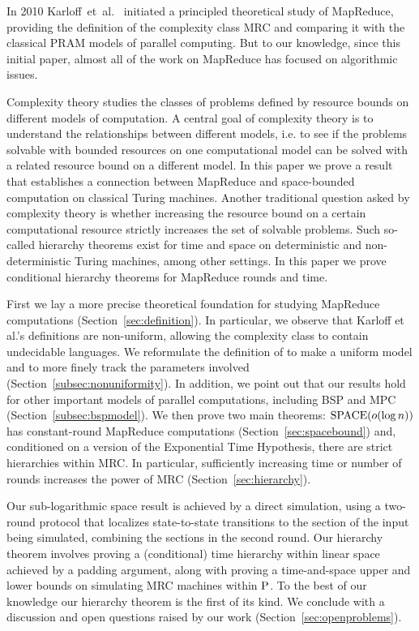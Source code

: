 \documentclass[11pt]{article}
\theoremstyle{definition}
\theoremstyle{remark}
\newcommand{\SPACE}{\textup{SPACE}}
\newcommand{\TISP}{\textup{TISP}}
\renewcommand{\P}{\textup{P}}
\begin{document}
In 2010 Karloff~et~al.~\cite{Karloff10} initiated a principled theoretical
study of MapReduce, providing the definition of the complexity class MRC and
comparing it with the classical PRAM models of parallel computing. But to our
knowledge, since this initial paper, almost all of the work on MapReduce has
focused on algorithmic issues.

Complexity theory studies the classes of problems defined by resource bounds on
different models of computation. A central goal of complexity theory is to
understand the relationships between different models, i.e. to see if the
problems solvable with bounded resources on one computational model can be
solved with a related resource bound on a different model.  In this paper we
prove a result that establishes a connection between MapReduce and
space-bounded computation on classical Turing machines.  Another traditional
question asked by complexity theory is whether increasing the resource bound on
a certain computational resource strictly increases the set of solvable
problems. Such so-called hierarchy theorems exist for time and space on
deterministic and non-deterministic Turing machines, among other settings.  In
this paper we prove conditional hierarchy theorems for MapReduce rounds and
time.

First we lay a more precise theoretical foundation for studying MapReduce
computations (Section~\ref{sec:definition}).
In particular, we observe that Karloff et al.'s definitions are
non-uniform, allowing the complexity class to contain undecidable languages.
We reformulate the definition of
\cite{Karloff10} to make a uniform model and to more finely track the
parameters involved (Section~\ref{subsec:nonuniformity}).
In addition, we point out that our results hold for
other important models of parallel computations, including BSP and MPC (Section~\ref{subsec:bspmodel}).
We then prove two main
theorems: $\SPACE(o(\log n))$ has constant-round MapReduce computations
(Section~\ref{sec:spacebound}) and, conditioned on a version of the
Exponential Time Hypothesis, there are strict hierarchies within MRC.  In
particular, sufficiently increasing time or number of rounds increases the
power of MRC (Section~\ref{sec:hierarchy}).

Our sub-logarithmic space result is achieved by a direct simulation, using a
two-round protocol that localizes state-to-state transitions to the section of
the input being simulated, combining the sections in the second round.  Our hierarchy
theorem involves proving a (conditional) time hierarchy within linear space%
 achieved by a padding argument, along with proving a time-and-space upper and lower bounds on
simulating MRC machines within $\P$. To the best of our knowledge our
hierarchy theorem is the first of its kind. We conclude with a discussion and open questions
raised by our work (Section~\ref{sec:openproblems}).
\end{document}
